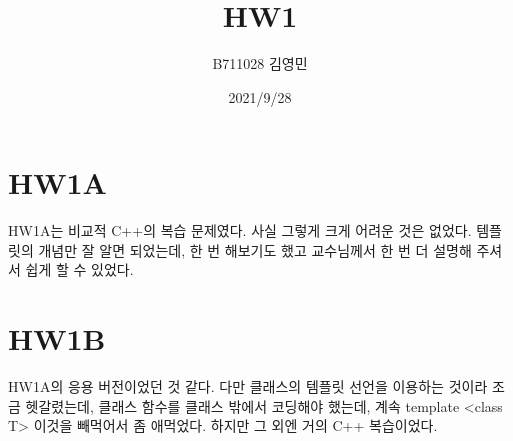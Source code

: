 \documentclass{article}
\title{HW1}
\author{B711028 김영민}
\date{2021/9/28}
\begin{document}
		\maketitle
	\section{HW1A}
	HW1A는 비교적 C++의 복습 문제였다. 사실 그렇게 크게 어려운 것은 없었다. 
	템플릿의 개념만 잘 알면 되었는데, 한 번 해보기도 했고 교수님께서 한 번 더 설명해 주셔서 쉽게 할 수 있었다.
	\section{HW1B}
	HW1A의 응용 버전이었던 것 같다. 다만 클래스의 템플릿 선언을 이용하는 것이라 조금 헷갈렸는데, 클래스 함수를 클래스 밖에서 코딩해야 했는데, 계속 template <class T> 이것을 빼먹어서 좀 애먹었다. 하지만 그 외엔 거의 C++ 복습이었다.
	
\end{document}

